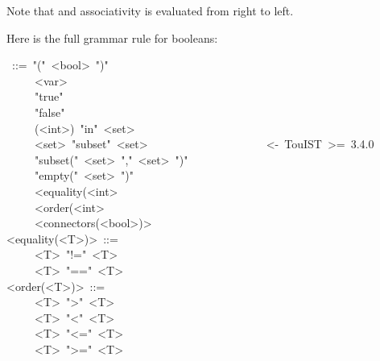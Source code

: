 \noindent Note that \mdcode{=\textgreater{}} and \mdcode{\textless{}=\textgreater{}} associativity is evaluated from right to left.%

Here is the full grammar rule for booleans:%
\begin{mdpre}%
~::=~"("~{\textless{}bool\textgreater{}}~")"\\
~~~~\textbar{}~{\textless{}var\textgreater{}}\\
~~~~\textbar{}~"true"\\
~~~~\textbar{}~"false"\\
~~~~\textbar{}~({\textless{}int\textgreater{}})~"in"~{\textless{}set\textgreater{}}\\
~~~~\textbar{}~{\textless{}set\textgreater{}}~"subset"~{\textless{}set\textgreater{}}~~~~~~~~~~~~~~~~~~~~~{\textless{}-~TouIST~\textgreater{}=~3.4.0}\\
~~~~\textbar{}~"subset("~{\textless{}set\textgreater{}}~","~{\textless{}set\textgreater{}}~")"\\
~~~~\textbar{}~"empty("~{\textless{}set\textgreater{}}~")"\\
~~~~\textbar{}~{\textless{}equality(\textless{}int\textgreater{}}\\
~~~~\textbar{}~{\textless{}order(\textless{}int\textgreater{}}\\
~~~~\textbar{}~{\textless{}connectors(\textless{}bool\textgreater{})\textgreater{}}\\
{\textless{}equality(\textless{}T\textgreater{})\textgreater{}}~::=\\
~~~~\textbar{}~{\textless{}T\textgreater{}}~"!="~{\textless{}T\textgreater{}}\\
~~~~\textbar{}~{\textless{}T\textgreater{}}~"=="~{\textless{}T\textgreater{}}\\
{\textless{}order(\textless{}T\textgreater{})\textgreater{}}~::=\\
~~~~\textbar{}~{\textless{}T\textgreater{}}~"\textgreater{}"~{\textless{}T\textgreater{}}\\
~~~~\textbar{}~{\textless{}T\textgreater{}}~"\textless{}"~{\textless{}T\textgreater{}}\\
~~~~\textbar{}~{\textless{}T\textgreater{}}~"\textless{}="~{\textless{}T\textgreater{}}\\
~~~~\textbar{}~{\textless{}T\textgreater{}}~"\textgreater{}="~{\textless{}T\textgreater{}}%
\end{mdpre}
